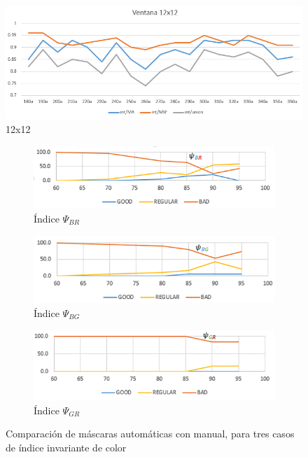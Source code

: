 \begin{figure}[h!]
    \includegraphics[width=\textwidth]{Imagenes/filter 12x12.png}
     \hfill
     \caption{12x12}
    \label{filter12x12}
\end{figure}



\begin{figure}[h!]
    \centering
  \begin{subfigure}[b]{0.8\textwidth}
    \includegraphics[width=\textwidth]{Imagenes/psiBR.png}
     \hfill
     \caption{Índice $\Psi_{BR}$}
    \label{psiazulrojo}
 \end{subfigure}

 \begin{subfigure}[b]{0.8\textwidth}
    \includegraphics[width=\textwidth]{Imagenes/psiBG.png}
     \hfill
     \caption{Índice $\Psi_{BG}$}
    \label{psiazulverde}
 \end{subfigure}

 \begin{subfigure}[b]{0.8\textwidth}
    \includegraphics[width=\textwidth]{Imagenes/psiGR.png}
     \hfill
     \caption{Índice $\Psi_{GR}$}
    \label{psiverderojo}
 \end{subfigure}
 \caption{Comparación de máscaras automáticas con manual, para tres casos de índice invariante de color}
        \label{compara_mascara}
\end{figure}